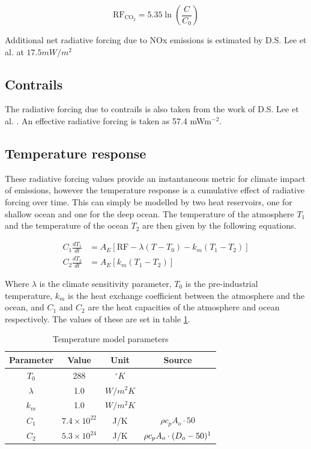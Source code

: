 \documentclass{article}
\begin{document}
\begin{equation}
    \text{RF}_{\text{CO}_2} = 5.35 \ln \left( \frac{C}{C_0} \right) \label{eq:rfco2}
\end{equation}

Additional net radiative forcing due to NOx emissions is estimated by D.S. Lee et al. at $17.5mW/m^2$

\subsection{Contrails}

The radiative forcing due to contrails is also taken from the work of D.S. Lee et al. \cite{contrail_radiative_forcing}.
An effective radiative forcing is taken as 57.4 mWm$^{-2}$.


\subsection{Temperature response}

These radiative forcing values provide an instantaneous metric for climate impact of emissions, however
the temperature response is a cumulative effect of radiative forcing over time.
This can simply be modelled by two heat reservoirs, one for shallow ocean and one for the deep ocean.
The temperature of the atmosphere $T_1$ and the temperature of the ocean $T_2$ are then given by the following equations.

\begin{align}
    C_1 \frac{dT_1}{dt} &= A_E[\text{RF} - \lambda(T - T_0) - k_m(T_1 - T_2)] \\
    C_2 \frac{dT_2}{dt} &= A_E[k_m(T_1 - T_2)]
\end{align}

Where $\lambda$ is the climate sensitivity parameter, $T_0$ is the pre-industrial temperature, $k_m$ is the heat exchange coefficient between the atmosphere and the ocean, and $C_1$ and $C_2$ are the heat capacities of the atmosphere and ocean respectively.
The values of these are set in table \ref{tab:temp_model_params}.

\begin{table}[H]
    \centering
    \begin{tabular}{cccc}
        \hline
        Parameter & Value & Unit & Source\\
        \hline
        $T_0$ & 288 & $^\circ K$ & \\
        $\lambda$ & 1.0 & $W/m^2K$ & \\
        $k_m$ & 1.0 & $W/m^2K$ & \\
        $C_1$ & $7.4\times 10^{22}$ & J/K & $\rho c_p A_o \cdot 50$  \\
        $C_2$ & $5.3\times 10^{24}$ & J/K & $\rho c_p A_o \cdot (D_o - 50) \footnotemark $\\
        \hline
    \end{tabular}
    \caption{Temperature model parameters}
    \label{tab:temp_model_params}
\end{table}
\end{document}
